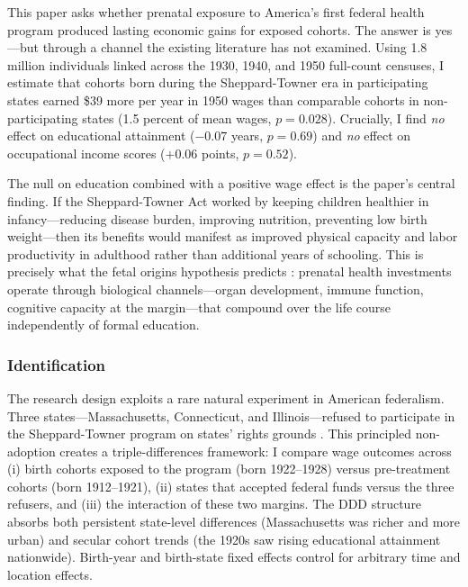 \documentclass[12pt]{article}
\begin{document}
This paper asks whether prenatal exposure to America's first federal health program produced lasting economic gains for exposed cohorts. The answer is yes---but through a channel the existing literature has not examined. Using 1.8 million individuals linked across the 1930, 1940, and 1950 full-count censuses, I estimate that cohorts born during the Sheppard-Towner era in participating states earned \$39 more per year in 1950 wages than comparable cohorts in non-participating states (1.5 percent of mean wages, $p = 0.028$). Crucially, I find \textit{no} effect on educational attainment ($-0.07$ years, $p = 0.69$) and \textit{no} effect on occupational income scores ($+0.06$ points, $p = 0.52$).

The null on education combined with a positive wage effect is the paper's central finding. If the Sheppard-Towner Act worked by keeping children healthier in infancy---reducing disease burden, improving nutrition, preventing low birth weight---then its benefits would manifest as improved physical capacity and labor productivity in adulthood rather than additional years of schooling. This is precisely what the fetal origins hypothesis predicts \citep{barker1990, almondcurrie2011}: prenatal health investments operate through biological channels---organ development, immune function, cognitive capacity at the margin---that compound over the life course independently of formal education.

\subsubsection*{Identification} The research design exploits a rare natural experiment in American federalism. Three states---Massachusetts, Connecticut, and Illinois---refused to participate in the Sheppard-Towner program on states' rights grounds \citep{lemon1973}. This principled non-adoption creates a triple-differences framework: I compare wage outcomes across (i) birth cohorts exposed to the program (born 1922--1928) versus pre-treatment cohorts (born 1912--1921), (ii) states that accepted federal funds versus the three refusers, and (iii) the interaction of these two margins. The DDD structure absorbs both persistent state-level differences (Massachusetts was richer and more urban) and secular cohort trends (the 1920s saw rising educational attainment nationwide). Birth-year and birth-state fixed effects control for arbitrary time and location effects.
\end{document}
